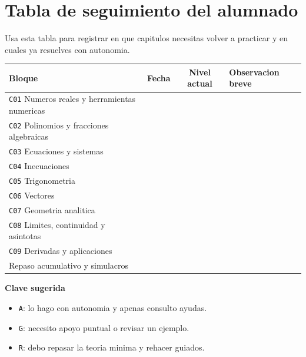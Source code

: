 \chapter*{Tabla de seguimiento del alumnado}

Usa esta tabla para registrar en que capitulos necesitas volver a practicar y en cuales ya
resuelves con autonomia.

\begin{tabularx}{\textwidth}{>{\raggedright\arraybackslash}p{} c c >{\raggedright\arraybackslash}X}
\toprule
Bloque & Fecha & Nivel actual & Observacion breve \\
\midrule
\texttt{C01} Numeros reales y herramientas numericas & & & \\
\texttt{C02} Polinomios y fracciones algebraicas & & & \\
\texttt{C03} Ecuaciones y sistemas & & & \\
\texttt{C04} Inecuaciones & & & \\
\texttt{C05} Trigonometria & & & \\
\texttt{C06} Vectores & & & \\
\texttt{C07} Geometria analitica & & & \\
\texttt{C08} Limites, continuidad y asintotas & & & \\
\texttt{C09} Derivadas y aplicaciones & & & \\
Repaso acumulativo y simulacros & & & \\
\bottomrule
\end{tabularx}

\vspace{1em}

\textbf{Clave sugerida}
\begin{itemize}[leftmargin=*]
  \item \texttt{A}: lo hago con autonomia y apenas consulto ayudas.
  \item \texttt{G}: necesito apoyo puntual o revisar un ejemplo.
  \item \texttt{R}: debo repasar la teoria minima y rehacer guiados.
\end{itemize}
